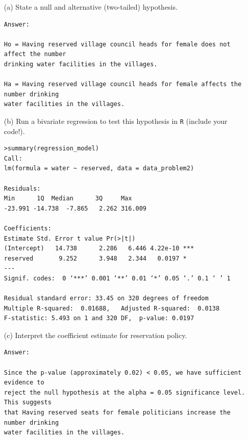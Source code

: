 \documentclass[12pt,letterpaper]{article}
\begin{document}
\newpage
\begin{enumerate}
	\item [(a)] State a null and alternative (two-tailed) hypothesis. 
\begin{verbatim}
Answer:

Ho = Having reserved village council heads for female does not affect the number 
drinking water facilities in the villages.

Ha = Having reserved village council heads for female affects the number drinking 
water facilities in the villages.
\end{verbatim} 

	\item [(b)] Run a bivariate regression to test this hypothesis in \texttt{R} (include your code!).
	
\begin{verbatim}
>summary(regression_model)
Call:
lm(formula = water ~ reserved, data = data_problem2)

Residuals:
Min      1Q  Median      3Q     Max 
-23.991 -14.738  -7.865   2.262 316.009 

Coefficients:
Estimate Std. Error t value Pr(>|t|)    
(Intercept)   14.738      2.286   6.446 4.22e-10 ***
reserved       9.252      3.948   2.344   0.0197 *  
---
Signif. codes:  0 ‘***’ 0.001 ‘**’ 0.01 ‘*’ 0.05 ‘.’ 0.1 ‘ ’ 1

Residual standard error: 33.45 on 320 degrees of freedom
Multiple R-squared:  0.01688,	Adjusted R-squared:  0.0138 
F-statistic: 5.493 on 1 and 320 DF,  p-value: 0.0197
\end{verbatim} 

	\item [(c)] Interpret the coefficient estimate for reservation policy. 
\begin{verbatim}
Answer:

Since the p-value (approximately 0.02) < 0.05, we have sufficient evidence to 
reject the null hypothesis at the alpha = 0.05 significance level. This suggests 
that Having reserved seats for female politicians increase the number drinking 
water facilities in the villages.
\end{verbatim} 	

\end{enumerate}
\end{document}
